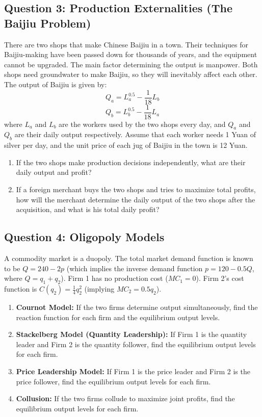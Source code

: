 \documentclass[12pt, a4paper]{article}
\begin{document}
\subsection*{Question 3: Production Externalities (The Baijiu Problem)}
There are two shops that make Chinese Baijiu in a town. Their techniques for Baijiu-making have been passed down for thousands of years, and the equipment cannot be upgraded. The main factor determining the output is manpower. Both shops need groundwater to make Baijiu, so they will inevitably affect each other. The output of Baijiu is given by:
\[ Q_a = L_a^{0.5} - \frac{1}{18}L_b \]
\[ Q_b = L_b^{0.5} - \frac{1}{18}L_a \]
where $L_a$ and $L_b$ are the workers used by the two shops every day, and $Q_a$ and $Q_b$ are their daily output respectively. Assume that each worker needs 1 Yuan of silver per day, and the unit price of each jug of Baijiu in the town is 12 Yuan.
\begin{enumerate}
    \item[(a)] If the two shops make production decisions independently, what are their daily output and profit?
    \item[(b)] If a foreign merchant buys the two shops and tries to maximize total profits, how will the merchant determine the daily output of the two shops after the acquisition, and what is his total daily profit?
\end{enumerate}

\subsection*{Question 4: Oligopoly Models}
A commodity market is a duopoly. The total market demand function is known to be $Q = 240 - 2p$ (which implies the inverse demand function $p = 120 - 0.5Q$, where $Q = q_1 + q_2$). Firm 1 has no production cost ($MC_1 = 0$). Firm 2's cost function is $C(q_2) = \frac{1}{4}q_2^2$ (implying $MC_2 = 0.5q_2$).
\begin{enumerate}
    \item[(a)] \textbf{Cournot Model:} If the two firms determine output simultaneously, find the reaction function for each firm and the equilibrium output levels.
    \item[(b)] \textbf{Stackelberg Model (Quantity Leadership):} If Firm 1 is the quantity leader and Firm 2 is the quantity follower, find the equilibrium output levels for each firm.
    \item[(c)] \textbf{Price Leadership Model:} If Firm 1 is the price leader and Firm 2 is the price follower, find the equilibrium output levels for each firm.
    \item[(d)] \textbf{Collusion:} If the two firms collude to maximize joint profits, find the equilibrium output levels for each firm.
\end{enumerate}
\end{document}
